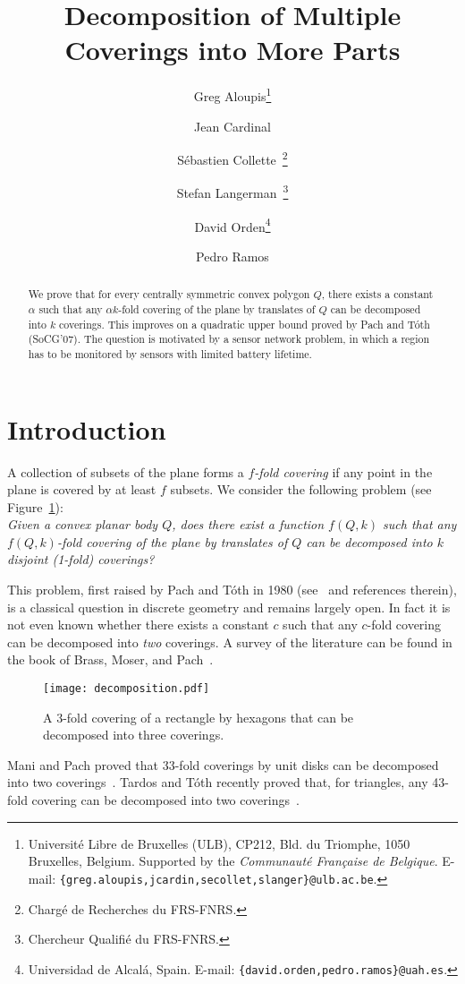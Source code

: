 \documentclass[english,11pt]{article}
\title{Decomposition of Multiple Coverings into More Parts}
\author{Greg Aloupis\thanks{Universit\'e Libre de Bruxelles (ULB), CP212, Bld. du Triomphe, 1050 Bruxelles, Belgium. Supported by the \emph{Communaut\'e Fran\c caise de Belgique}. E-mail: {\tt \{greg.aloupis,jcardin,secollet,slanger\}@ulb.ac.be}.} \and Jean Cardinal\footnotemark[1] \and  S\'ebastien Collette\footnotemark[1]~\thanks{Charg\'e de Recherches du FRS-FNRS.} \and Stefan Langerman\footnotemark[1]~\thanks{Chercheur Qualifi\'e du FRS-FNRS.} \and David Orden\thanks{Universidad de Alcal\'a, Spain. E-mail: {\tt \{david.orden,pedro.ramos\}@uah.es}.}  \and Pedro Ramos\footnotemark[4]}
\date{}
\begin{document}
\maketitle
\sloppy

\begin{abstract}
We prove that for every centrally symmetric convex polygon $Q$, there exists a constant $\alpha$ such that any $\alpha k$-fold covering of the plane by
translates of $Q$ can be decomposed into $k$ coverings. This improves on a quadratic upper bound proved by Pach and T\'oth (SoCG'07). The question is motivated by a sensor network problem, in which a region has to be monitored by sensors with limited battery lifetime.
\end{abstract}

\section{Introduction}

A collection of subsets of the plane forms a {\em $f$-fold covering} if any point in the plane is covered by at least $f$ subsets. We consider the following problem (see Figure~\ref{fig:decomp}):\\
{\em Given a convex planar body $Q$, does there exist a function $f(Q,k)$ such that any $f(Q,k)$-fold covering of the plane by translates of $Q$ can be decomposed into $k$ disjoint (1-fold) coverings?}\medskip

This problem, first raised by Pach and T\'oth in 1980 (see~\cite{Pa80} and references therein), is  a classical question in discrete geometry and remains largely open. In fact it is not even known whether there exists a constant $c$ such that any $c$-fold covering  can be decomposed into {\em two} coverings. A survey of the literature can be found in the book of Brass, Moser, and Pach~\cite{RPDG}.\medskip

\begin{figure}[htb]
\begin{center}
\texttt{[image: decomposition.pdf]}
\end{center}
\caption{\label{fig:decomp}A $3$-fold covering of a rectangle by hexagons that can be decomposed into three coverings.}
\end{figure}

Mani and Pach proved that 33-fold coverings by unit disks can be decomposed into two coverings~\cite{MP86}. Tardos and T\'{o}th recently proved that, for triangles, any 43-fold covering can be decomposed into two coverings~\cite{TT07}. 
\end{document}
